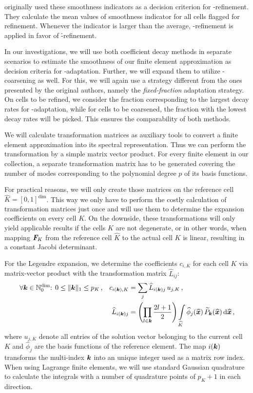 \textcite{bangerth2009} originally used these smoothness indicators as a decision criterion for \hp-refinement. They calculate the mean values of smoothness indicator for all cells flagged for refinement. Whenever the indicator is larger than the average, \p-refinement is applied in favor of \h-refinement.

In our investigations, we will use both coefficient decay methods in separate scenarios to estimate the smoothness of our finite element approximation as decision criteria for \hp-adaptation. Further, we will expand them to utilize \hp-coarsening as well. For this, we will again use a strategy different from the ones presented by the original authors, namely the \textit{fixed-fraction} adaptation strategy. On cells to be refined, we consider the fraction corresponding to the largest decay rates for \p-adaptation, while for cells to be coarsened, the fraction with the lowest decay rates will be picked. This ensures the comparability of both methods.

We will calculate transformation matrices as auxiliary tools to convert a finite element approximation into its spectral representation. Thus we can perform the transformation by a simple matrix vector product. For every finite element in our collection, a separate transformation matrix has to be generated covering the number of modes corresponding to the polynomial degree $p$ of its basis functions.

For practical reasons, we will only create those matrices on the reference cell $\widehat{K} = [0,1]^\text{dim}$. This way we only have to perform the costly calculation of transformation matrices just once and will use them to determine the expansion coefficients on every cell $K$. On the downside, these transformations will only yield applicable results if the cells $K$ are not degenerate, or in other words, when mapping $\mat{F}_K$ from the reference cell $\widehat{K}$ to the actual cell $K$ is linear, resulting in a constant Jacobi determinant.

For the Legendre expansion, we determine the coefficients $c_{i,K}$ for each cell $K$ via matrix-vector product with the transformation matrix $\widehat{L}_{ij}$:
\begin{align}
&\forall \tuple{k} \in \mathbb{N}_0^\text{dim} \text{: } 0 \leq \|\tuple{k}\|_1 \leq p_K \,\text{,} &
c_{i(\tuple{k}),K} &= \sum\limits_j \widehat{L}_{i(\tuple{k})j} \, u_{j,K} \,\text{,} \\
&& \widehat{L}_{i(\tuple{k})j} &= \left(\prod\limits_{l \in \tuple{k}} \frac{2l+1}{2}\right) \int\limits_{\widehat{K}} \widehat{\phi}_j(\vec{\widehat{x}}) \, \widetilde{P}_\tuple{k}(\vec{\widehat{x}}) \differential{\vec{\widehat{x}}} \,\text{,}
\end{align}
where $u_{j,K}$ denote all entries of the solution vector belonging to the current cell $K$ and $\widehat{\phi}_j$ are the basis functions of the reference element. The map $i(\tuple{k})$ transforms the multi-index $\tuple{k}$ into an unique integer used as a matrix row index. When using Lagrange finite elements, we will use standard Gaussian quadrature to calculate the integrals with a number of quadrature points of $p_K + 1$ in each direction.

